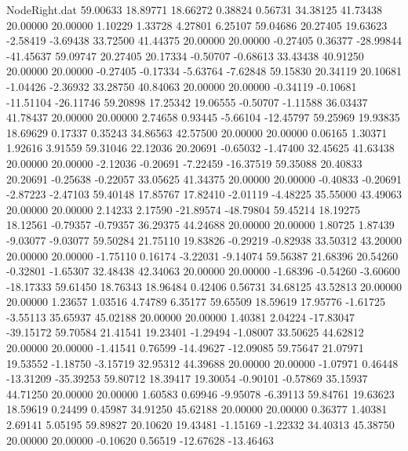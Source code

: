 \begin{filecontents}{NodeRight.dat}
  59.00633   18.89771   18.66272     0.38824    0.56731   34.38125   41.73438   20.00000   20.00000    1.10229    1.33728    4.27801    6.25107
  59.04686   20.27405   19.63623    -2.58419   -3.69438   33.72500   41.44375   20.00000   20.00000   -0.27405    0.36377  -28.99844  -41.45637
  59.09747   20.27405   20.17334    -0.50707   -0.68613   33.43438   40.91250   20.00000   20.00000   -0.27405   -0.17334   -5.63764   -7.62848
  59.15830   20.34119   20.10681    -1.04426   -2.36932   33.28750   40.84063   20.00000   20.00000   -0.34119   -0.10681  -11.51104  -26.11746
  59.20898   17.25342   19.06555    -0.50707   -1.11588   36.03437   41.78437   20.00000   20.00000    2.74658    0.93445   -5.66104  -12.45797
  59.25969   19.93835   18.69629     0.17337    0.35243   34.86563   42.57500   20.00000   20.00000    0.06165    1.30371    1.92616    3.91559
  59.31046   22.12036   20.20691    -0.65032   -1.47400   32.45625   41.63438   20.00000   20.00000   -2.12036   -0.20691   -7.22459  -16.37519
  59.35088   20.40833   20.20691    -0.25638   -0.22057   33.05625   41.34375   20.00000   20.00000   -0.40833   -0.20691   -2.87223   -2.47103
  59.40148   17.85767   17.82410    -2.01119   -4.48225   35.55000   43.49063   20.00000   20.00000    2.14233    2.17590  -21.89574  -48.79804
  59.45214   18.19275   18.12561    -0.79357   -0.79357   36.29375   44.24688   20.00000   20.00000    1.80725    1.87439   -9.03077   -9.03077
  59.50284   21.75110   19.83826    -0.29219   -0.82938   33.50312   43.20000   20.00000   20.00000   -1.75110    0.16174   -3.22031   -9.14074
  59.56387   21.68396   20.54260    -0.32801   -1.65307   32.48438   42.34063   20.00000   20.00000   -1.68396   -0.54260   -3.60600  -18.17333
  59.61450   18.76343   18.96484     0.42406    0.56731   34.68125   43.52813   20.00000   20.00000    1.23657    1.03516    4.74789    6.35177
  59.65509   18.59619   17.95776    -1.61725   -3.55113   35.65937   45.02188   20.00000   20.00000    1.40381    2.04224  -17.83047  -39.15172
  59.70584   21.41541   19.23401    -1.29494   -1.08007   33.50625   44.62812   20.00000   20.00000   -1.41541    0.76599  -14.49627  -12.09085
  59.75647   21.07971   19.53552    -1.18750   -3.15719   32.95312   44.39688   20.00000   20.00000   -1.07971    0.46448  -13.31209  -35.39253
  59.80712   18.39417   19.30054    -0.90101   -0.57869   35.15937   44.71250   20.00000   20.00000    1.60583    0.69946   -9.95078   -6.39113
  59.84761   19.63623   18.59619     0.24499    0.45987   34.91250   45.62188   20.00000   20.00000    0.36377    1.40381    2.69141    5.05195
  59.89827   20.10620   19.43481    -1.15169   -1.22332   34.40313   45.38750   20.00000   20.00000   -0.10620    0.56519  -12.67628  -13.46463

\end{filecontents}
